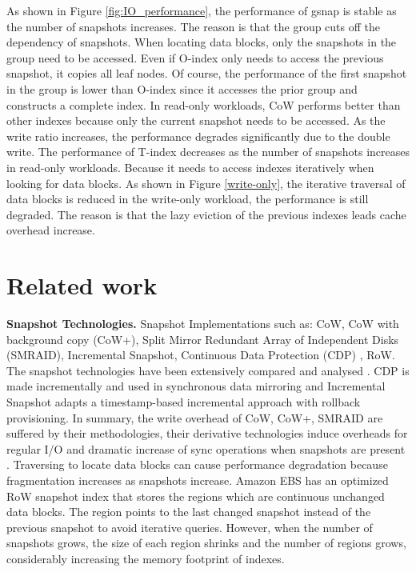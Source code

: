 \documentclass[sigconf, nonacm]{acmart}
\begin{document}
As shown in Figure \ref{fig:IO_performance}, the performance of gsnap is stable as the number of snapshots increases. The reason is that the group cuts off the dependency of snapshots. When locating data blocks, only the snapshots in the group need to be accessed. Even if O-index only needs to access the previous snapshot, it copies all leaf nodes. Of course, the performance of the first snapshot in the group is lower than O-index since it accesses the prior group and constructs a complete index. In read-only workloads, CoW performs better than other indexes because only the current snapshot needs to be accessed. As the write ratio increases, the performance degrades significantly due to the double write.
The performance of T-index decreases as the number of snapshots increases in read-only workloads. Because it needs to access indexes iteratively when looking for data blocks. As shown in Figure \ref{write-only}, the iterative traversal of data blocks is reduced in the write-only workload, the performance is still degraded. The reason is that the lazy eviction of the previous indexes leads cache overhead increase.

\section{Related work}
\label{Relatedwork}
\textbf{Snapshot Technologies.}
Snapshot Implementations such as: CoW, CoW with background copy (CoW+), Split Mirror Redundant Array of Independent Disks (SMRAID), Incremental Snapshot, Continuous Data Protection (CDP) \cite{garimella2006understanding}, RoW. The snapshot technologies have been extensively compared and analysed \cite{mahipal2021virtual,joseph2019securing,almulla2013distributed,subramanian2014snapshots}. CDP is made incrementally and used  in synchronous data mirroring  and Incremental Snapshot adapts a timestamp-based incremental approach with rollback provisioning. In summary, the write overhead of CoW, CoW+, SMRAID are suffered by their methodologies, their derivative technologies induce overheads for regular I/O and dramatic increase of sync operations when snapshots are present \cite{subramanian2014snapshots,li2012irow}. 
Traversing to locate data blocks can cause performance degradation because fragmentation increases as snapshots increase.
Amazon EBS \cite{varia2014overview} has an optimized RoW snapshot index that stores the regions which are continuous unchanged data blocks. The region points to the last changed snapshot instead of the previous snapshot to avoid iterative queries.
However, when the number of snapshots grows, the size of each region shrinks and the number of regions grows, considerably increasing the memory footprint of indexes.
\end{document}
